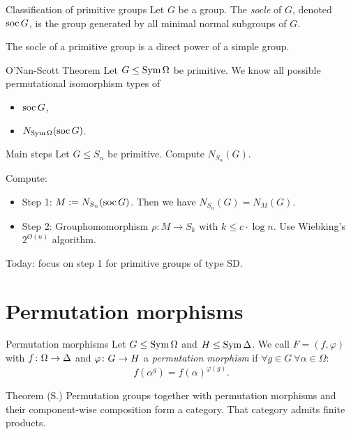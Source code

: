 \documentclass{beamer}
\theoremstyle{plain}
\theoremstyle{definition}
\begin{document}
\begin{frame}{Classification of primitive groups}
Let $G$ be a group. The \emph{socle} of $G$, denoted $\operatorname{soc} G$,
is the group generated by all minimal normal subgroups of $G$.

The socle of a primitive group is a direct power of a simple group.
\pause
\begin{block}{O'Nan-Scott Theorem}
    Let $G \leq \operatorname{Sym} \Omega$ be primitive.
    We know all possible permutational isomorphism types of
    \vspace{-0.5em}
    \begin{itemize}
        \item
        $\operatorname{soc} G$,
        \item
        $N_{\operatorname{Sym} \Omega}(\operatorname{soc} G)$.
    \end{itemize}
\end{block}
\end{frame}


\begin{frame}{Main steps}
Let $G \leq S_n$ be primitive.
Compute $N_{S_n}(G)$.

Compute:
\begin{itemize}
\item Step 1: $M := N_{S_n}(\operatorname{soc} G)$.
Then we have $N_{S_n}(G) = N_M(G)$.

\item Step 2: Grouphomomorphism
$
    \rho : M \to S_k
$
with $k \leq c \cdot \log n$.
Use Wiebking's $2 ^ {O(n)}$ algorithm.
\end{itemize}
\vspace{1em}

\pause
Today: focus on step 1 for primitive groups of type SD.
\end{frame}

\section{Permutation morphisms}
\begin{frame}{Permutation morphisms}
Let $G \leq \operatorname{Sym} \Omega$ and $H \leq \operatorname{Sym} \Delta$.
We call $F = (f, \varphi)$ with
$f \colon \Omega \rightarrow \Delta$
and
$\varphi \colon G \rightarrow H$
a \emph{permutation morphism}
if
$\forall g \in G ~ \forall \alpha \in \Omega :$
\[
    f(\alpha ^ g) = f(\alpha) ^ {\varphi(g)}.
\]

\pause
\begin{block}{Theorem (S.)}
Permutation groups together with permutation morphisms and their component-wise
composition form a category.
That category admits finite products.
\end{block}
\end{frame}
\end{document}
